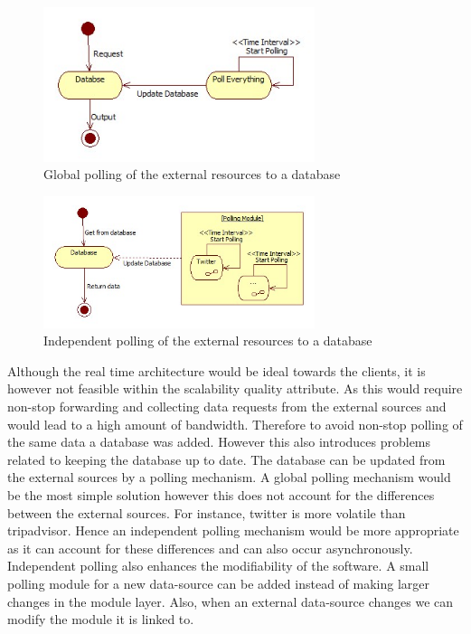 \documentclass{article}
\begin{document}
\begin{figure}[!]
\centering
\includegraphics[width=300px]{GlobalPolling}
\caption{Global polling of the external resources to a database}
\label{fig:fig3}
\end{figure}

\begin{figure}[!]
\centering
\includegraphics[width=300px]{IndependentPolling}
\caption{Independent polling of the external resources to a database}
\label{fig:fig4}
\end{figure}

Although the real time architecture would be ideal towards the clients, it is however not feasible within the scalability quality attribute. As this would require non-stop forwarding and collecting data requests from the external sources and would lead to a high amount of bandwidth. Therefore to avoid non-stop polling of the same data a database was added. However this also introduces problems related to keeping the database up to date. The database can be updated from the external sources by a polling mechanism. A global polling mechanism would be the most simple solution however this does not account for the differences between the external sources. For instance, twitter is more volatile than tripadvisor. Hence an independent polling mechanism would be more appropriate as it can account for these differences and can also occur asynchronously. 
Independent polling also enhances the modifiability of the software.
A small polling module for a new data-source can be added instead of making larger changes in the module layer. Also, when an external data-source changes we can modify the module it is linked to.
\end{document}
